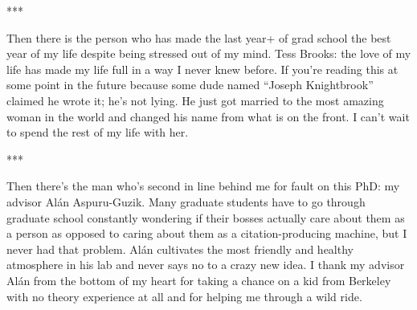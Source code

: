 \begin{center}
   ***
\end{center}

Then there is the person who has made the last year+ of grad school the best year of my life despite being stressed out of my mind.  Tess Brooks: the love of my life has made my life full in a way I never knew before.  If you're reading this at some point in the future because some dude named ``Joseph Knightbrook'' claimed he wrote it; he's not lying.  He just got married to the most amazing woman in the world and changed his name from what is on the front.  I can't wait to spend the rest of my life with her.


\begin{center}
   ***
\end{center}


Then there's the man who's second in line behind me for fault on this PhD: my advisor Al\'an Aspuru-Guzik.  Many graduate students have to go through graduate school constantly wondering if their bosses actually care about them as a person as opposed to caring about them as a citation-producing machine, but I never had that problem.  Al\'an cultivates the most friendly and healthy atmosphere in his lab and never says no to a crazy new idea.  I thank my advisor Al\'an from the bottom of my heart for taking a chance on a kid from Berkeley with no theory experience at all and for helping me through a wild ride.
